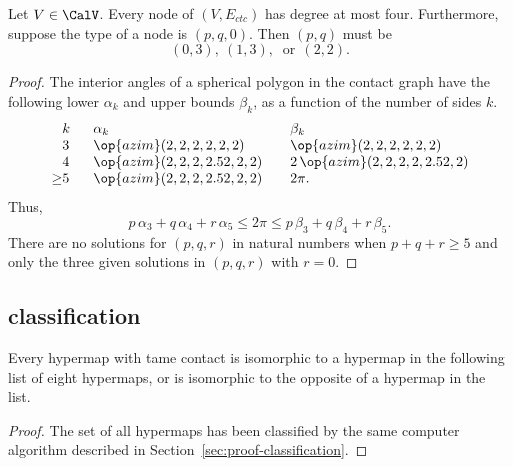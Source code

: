 \begin{lemma}[]\label{lemma:no-5} 
  Let $V\in \CalV$.  Every node of $(V,E_{ctc})$ has degree at most
  four.  Furthermore, suppose the type of a node is $(p,q,0)$.  Then
  $(p,q)$ must be
\[
(0,3),~(1,3),~\text{ or}~~(2,2).
\]
\end{lemma}

\begin{proof} The interior angles of a spherical polygon in the
  contact graph have the following lower $\alpha_k$ and upper bounds
  $\beta_k$, as a function of the number of sides $k$.
\begin{equation}
\begin{array}{lllll}
  \phantom{\ge}k~~&\alpha_k & \beta_k\\
  \phantom{\ge}3~~&\op{azim}(2,2,2,2,2,2)  &\op{azim}(2,2,2,2,2,2)\\
  \phantom{\ge}4~~&\op{azim}(2,2,2,2.52,2,2) &2\,\op{azim}(2,2,2,2,2.52,2)\\
  {\ge}5~~& \op{azim}(2,2,2,2.52,2,2) ~~~& 2\pi.
\end{array}
\end{equation}
Thus,
\[
  p\,\alpha_3 + q\,\alpha_4 +r\, \alpha_5 
\le 2\pi \le p\,\beta_3 + q\,\beta_4 + r \,\beta_5.
\]
There are no solutions for
$(p,q,r)$ in natural numbers when $p+q+r\ge 5$ and
 only the three given solutions in $(p,q,r)$ with $r=0$.
\end{proof}



\subsection{classification}


\begin{lemma}
  \label{lemma:contact-classification} Every hypermap with tame
  contact is isomorphic to a hypermap in the following list of eight
  hypermaps, or is isomorphic to the opposite of a hypermap in the
  list.  %
\end{lemma}

\begin{proof}
  The set of all hypermaps has been classified by the same computer
  algorithm described in Section~\ref{sec:proof-classification}.
\end{proof}



